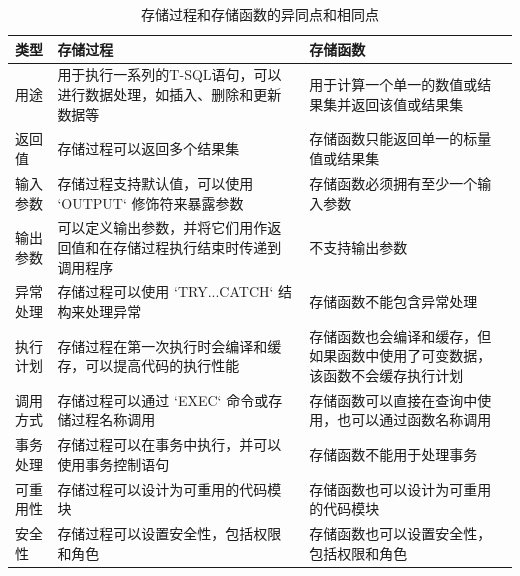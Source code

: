 \documentclass[a4paper,twoside]{article}
\begin{document}
\begin{spacing}{1.2}
\begin{enumerate}
\begin{table}[!ht]
  \centering
  \caption{存储过程和存储函数的异同点和相同点}
  \renewcommand{\arraystretch}{1.5}
  \begin{tabularx}{\linewidth}{@{}|X|X|X|@{}}
    \hline
    类型 & 存储过程 & 存储函数 \\
    \hline
    用途 & 用于执行一系列的T-SQL语句，可以进行数据处理，如插入、删除和更新数据等 &
      用于计算一个单一的数值或结果集并返回该值或结果集 \\\hline
    返回值 & 存储过程可以返回多个结果集 & 存储函数只能返回单一的标量值或结果集 \\\hline
    输入参数 & 存储过程支持默认值，可以使用 `OUTPUT` 修饰符来暴露参数 &
      存储函数必须拥有至少一个输入参数 \\\hline
    输出参数 & 可以定义输出参数，并将它们用作返回值和在存储过程执行结束时传递到调用程序 & 
      不支持输出参数 \\\hline
    异常处理 & 存储过程可以使用 `TRY...CATCH` 结构来处理异常 &
      存储函数不能包含异常处理 \\\hline
    执行计划 & 存储过程在第一次执行时会编译和缓存，可以提高代码的执行性能 &
      存储函数也会编译和缓存，但如果函数中使用了可变数据，该函数不会缓存执行计划 \\\hline
    调用方式 & 存储过程可以通过 `EXEC` 命令或存储过程名称调用 &
      存储函数可以直接在查询中使用，也可以通过函数名称调用 \\\hline
    事务处理 & 存储过程可以在事务中执行，并可以使用事务控制语句 & 存储函数不能用于处理事务 \\\hline
    可重用性 & 存储过程可以设计为可重用的代码模块 & 存储函数也可以设计为可重用的代码模块 \\\hline
    安全性 & 存储过程可以设置安全性，包括权限和角色 & 存储函数也可以设置安全性，包括权限和角色 \\
    \hline
  \end{tabularx}
  \label{tab:storedprocedurefunctioncompare}
\end{table}


\end{enumerate}
\end{spacing}
\end{document}
